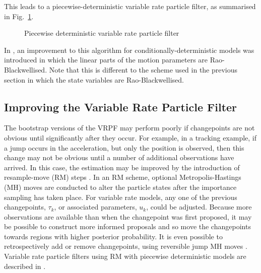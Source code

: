 \documentclass[10pt,twocolumn,twoside]{IEEEtran}
\begin{document}
This leads to a piecewise-deterministic variable rate particle filter, as summarised in Fig.~\ref{alg:VRPF}.

\begin{figure}
\caption{Piecewise deterministic variable rate particle filter}
\label{alg:VRPF}
\end{figure}

In \cite{Morelande2009a}, an improvement to this algorithm for conditionally-deterministic models was introduced in which the linear parts of the motion parameters are Rao-Blackwellised. Note that this is different to the scheme used in the previous section in which the state variables are Rao-Blackwellised.



\subsection{Improving the Variable Rate Particle Filter}

The bootstrap versions of the VRPF may perform poorly if changepoints are not obvious until significantly after they occur. For example, in a tracking example, if a jump occurs in the acceleration, but only the position is observed, then this change may not be obvious until a number of additional observations have arrived. In this case, the estimation may be improved by the introduction of resample-move (RM) steps \cite{Gilks2001}. In an RM scheme, optional Metropolis-Hastings (MH) moves are conducted to alter the particle states after the importance sampling has taken place. For variable rate models, any one of the previous changepoints, $\tau_k$, or associated parameters, $u_k$, could be adjusted. Because more observations are available than when the changepoint was first proposed, it may be possible to construct more informed proposals and so move the changepoints towards regions with higher posterior probability. It is even possible to retrospectively add or remove changepoints, using reversible jump MH moves \cite{Green1995}. Variable rate particle filters using RM with piecewise deterministic models are described in \cite{Whiteley2011,Gilholm2008}.
\end{document}
